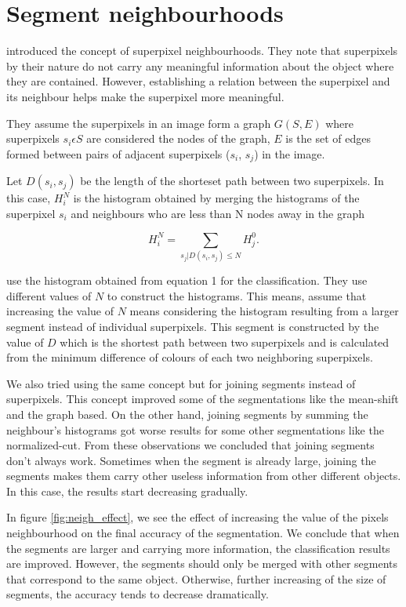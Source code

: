 \documentclass[twoside,11pt]{article}
\begin{document}
\section{Segment neighbourhoods}

\cite{fulkerson09class} introduced the concept of superpixel
neighbourhoods. They note  that superpixels by their nature do not
carry any meaningful information about the object where they are contained.
However, establishing a relation between the superpixel and its neighbour helps
make the superpixel more meaningful.

They assume the superpixels in an image form a graph $G(S, E)$ where
superpixels $s_i \epsilon S$ are considered the nodes of the graph, $E$ is the set
of edges formed between pairs of adjacent superpixels ($s_i$, $s_j$) in the
image.

Let $D(s_i, s_j)$ be the length of the shorteset path between two superpixels.
In this case, $H_i^N$ is the histogram obtained by merging the histograms of the
superpixel $s_i$ and neighbours who are less than N nodes away in the graph

\begin{equation}
\label{eq:one}
H_i^N = \sum_{s_j|D(s_i,s_j)\leq{N}} H_j^0.
\end{equation}

\cite{fulkerson09class} use the histogram obtained from equation 1
for the classification. They use different values of $N$ to construct the histograms.
This means, \cite{fulkerson09class} assume that increasing the value of $N$ means
considering the histogram resulting from a larger segment instead of individual
superpixels. This segment is constructed by the value of $D$ which is the shortest
path between two superpixels and is calculated from the minimum difference of
colours of each two neighboring superpixels.

We also tried using the same concept but for joining segments instead of superpixels. 
This concept improved some of the segmentations like the mean-shift and the
graph based. On the other hand, joining segments by summing the neighbour's
histograms got worse results for some other segmentations like the
normalized-cut. From these observations we concluded that joining segments don't
always work. Sometimes when the segment is already large, joining the segments makes
them carry other useless information from other different objects. In this
case, the results start decreasing gradually.

In figure \ref{fig:neigh_effect}, we see the effect of increasing the value of 
the pixels neighbourhood on the final accuracy of the segmentation.
We conclude that when the
segments are larger and carrying more information, the classification results
are improved. However, the segments should only be merged with other segments
that correspond to the same object. Otherwise, further increasing
of the size of segments, the accuracy tends to decrease dramatically.
\end{document}
